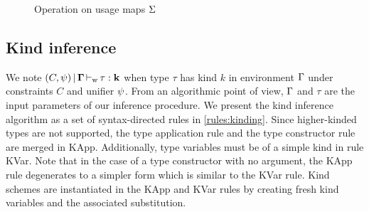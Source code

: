 \begin{figure}[tp]\centering
{}
\caption{Operation on usage maps $\Sigma$}
\label{op:usgmap}
\end{figure}

\subsection{Kind inference}

We note $(C,\mathrm{\psi}) \operatorname{|} \bf{\Gamma} \operatorname{\vdash_w} \bf{\tau} : k$ when type $\tau$ has kind $k$
in environment $\Gamma$ under constraints $C$ and unifier $\mathrm{\psi}$. From an
algorithmic point of view, $\Gamma$ and $\tau$ are the input parameters of
our inference procedure.
We present the kind inference algorithm as a set of syntax-directed rules in
\cref{rules:kinding}.
Since higher-kinded types are not supported, the type application
rule and the type constructor rule are merged in {\sc KApp}.
Additionally, type variables must be of a simple kind in rule {\sc KVar}.
Note that in the case of a type constructor with no argument, the {\sc KApp}
rule degenerates to a simpler form which is similar to the {\sc KVar} rule.
Kind schemes are instantiated in the {\sc KApp} and {\sc KVar} rules by creating
fresh kind variables and the associated substitution.

